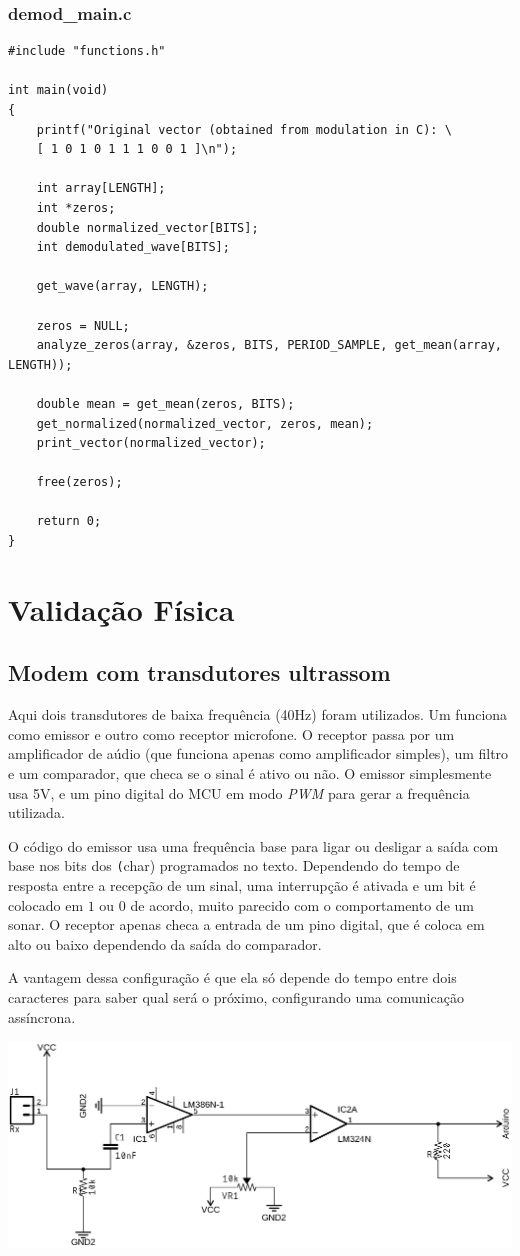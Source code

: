 \documentclass[11pt,a4paper]{report}
\begin{document}
	\subsection{demod\_main.c}
		\begin{verbatim}
#include "functions.h"
		
int main(void)
{
	printf("Original vector (obtained from modulation in C): \
	[ 1 0 1 0 1 1 1 0 0 1 ]\n");
			
	int array[LENGTH];
	int *zeros;
	double normalized_vector[BITS];
	int demodulated_wave[BITS];
			
	get_wave(array, LENGTH);
			
	zeros = NULL;
	analyze_zeros(array, &zeros, BITS, PERIOD_SAMPLE, get_mean(array, LENGTH));
			
	double mean = get_mean(zeros, BITS);
	get_normalized(normalized_vector, zeros, mean);
	print_vector(normalized_vector);
			
	free(zeros);
			
	return 0;
}
		\end{verbatim}
		
	

	

		
		
\chapter{Validação Física}
\section{Modem com transdutores ultrassom}

Aqui dois transdutores de baixa frequência (40Hz) foram utilizados. Um funciona como emissor e outro como receptor microfone. O receptor passa por um amplificador de aúdio (que funciona apenas como amplificador simples), um filtro e um comparador, que checa se o sinal é ativo ou não. O emissor simplesmente usa 5V, e um pino digital do MCU em modo {\it PWM} para gerar a frequência utilizada.

O código do emissor usa uma frequência base para ligar ou desligar a saída com base nos bits dos \texttt(char) programados no texto. Dependendo do tempo de resposta entre a recepção de um sinal, uma interrupção é ativada e um bit é colocado em $1$ ou $0$ de acordo, muito parecido com o comportamento de um sonar. O receptor apenas checa a entrada de um pino digital, que é coloca em alto ou baixo dependendo da saída do comparador.


A vantagem dessa configuração é que ela só depende do tempo entre dois caracteres para saber qual será o próximo, configurando uma comunicação assíncrona.

\begin{center}
	\includegraphics{rx_circuit}
\end{center}
\end{document}
